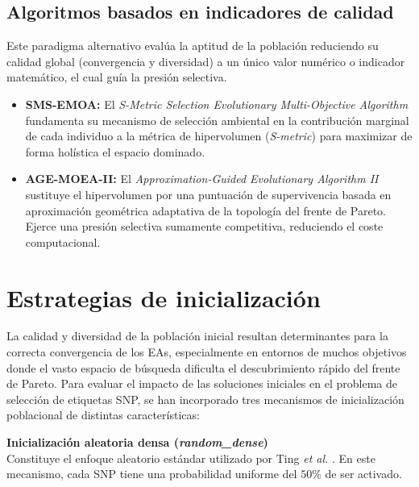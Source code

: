\subsection{Algoritmos basados en indicadores de calidad}
Este paradigma alternativo evalúa la aptitud de la población reduciendo su calidad global (convergencia y diversidad) a un único valor numérico o indicador matemático, el cual guía la presión selectiva.
\begin{itemize}
    \item \textbf{SMS-EMOA:} El \textit{S-Metric Selection Evolutionary Multi-Objective Algorithm} \cite{beume2007sms} fundamenta su mecanismo de selección ambiental en la contribución marginal de cada individuo a la métrica de hipervolumen (\textit{S-metric}) para maximizar de forma holística el espacio dominado.
    \item \textbf{AGE-MOEA-II:} El \textit{Approximation-Guided Evolutionary Algorithm II} \cite{panichella2022adaptive} sustituye el hipervolumen por una puntuación de supervivencia basada en aproximación geométrica adaptativa de la topología del frente de Pareto. Ejerce una presión selectiva sumamente competitiva, reduciendo el coste computacional.
\end{itemize}

\section{Estrategias de inicialización}

La calidad y diversidad de la población inicial resultan determinantes para la correcta convergencia de los EAs, especialmente en entornos de muchos objetivos donde el vasto espacio de búsqueda dificulta el descubrimiento rápido del frente de Pareto. Para evaluar el impacto de las soluciones iniciales en el problema de selección de etiquetas SNP, se han incorporado tres mecanismos de inicialización poblacional de distintas características:

\textbf{Inicialización aleatoria densa (\textit{random\_dense})} \\
Constituye el enfoque aleatorio estándar utilizado por Ting \textit{et al.} \cite{ting2010multi}. En este mecanismo, cada SNP tiene una probabilidad uniforme del $50\%$ de ser activado.


